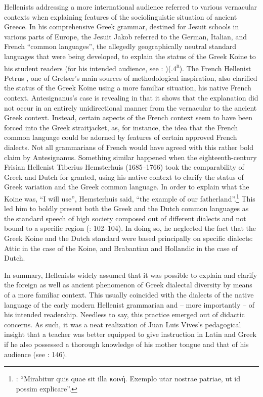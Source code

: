 Hellenists addressing a more international audience referred to various vernacular contexts when explaining features of the sociolinguistic situation of ancient Greece. In his comprehensive Greek grammar, destined for Jesuit schools in various parts of Europe, the Jesuit Jakob \citet[20]{Gretser1593} referred to the German, Italian, and French “common languages”, the allegedly geographically neutral standard languages that were being developed, to explain the status of the Greek Koine to his student readers (for his intended audience, see \citealt{Gretser1593}: )(.4\textsc{\textsuperscript{r}}). The French Hellenist Petrus \citet[11--12]{Antesignanus1554}, one of Gretser’s main sources of methodological inspiration, also clarified the status of the Greek Koine using a more familiar situation, his native French context. Antesignanus’s case is revealing in that it shows that the explanation did not occur in an entirely unidirectional manner from the vernacular to the ancient Greek context. Instead, certain aspects of the French context seem to have been forced into the Greek straitjacket, as, for instance, the idea that the French common language could be adorned by features of certain approved French dialects. Not all grammarians of French would have agreed with this rather bold claim by Antesignanus. Something similar happened when the eighteenth-century Frisian Hellenist Tiberius Hemsterhuis (1685–1766) took the comparability of Greek and Dutch for granted, using his native context to clarify the status of Greek variation and the Greek common language. In order to explain what the Koine was, “I will use”, Hemsterhuis said, “the example of our fatherland”.\footnote{\citet[102]{Hemsterhuis2015}: “Mirabitur quis quae sit illa κoινή. Exemplo utar nostrae patriae, ut id possim explicare”.} This led him to boldly present both the Greek and the Dutch common languages as the standard speech of high society composed out of different dialects and not bound to a specific region (\citealt{Hemsterhuis2015}: 102–104). In doing so, he neglected the fact that the Greek Koine and the Dutch standard were based principally on specific dialects: Attic in the case of the Koine, and Brabantian and Hollandic in the case of Dutch.

In summary, Hellenists widely assumed that it was possible to explain and clarify the foreign as well as ancient phenomenon of Greek dialectal diversity by means of a more familiar context. This usually coincided with the dialects of the native language of the early modern Hellenist grammarian and – more importantly – of his intended readership. Needless to say, this practice emerged out of didactic concerns. As such, it was a neat realization of Juan Luis Vives’s pedagogical insight that a teacher was better equipped to give instruction in Latin and Greek if he also possessed a thorough knowledge of his mother tongue and that of his audience (see \citealt{Padley1985}: 146).

